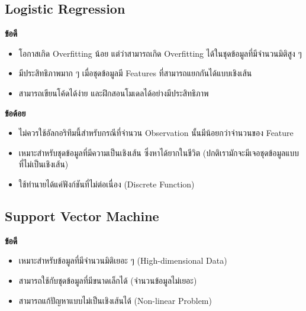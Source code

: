 \subsection{Logistic Regression}
\label{ssec:pros_cons_log_reg}

\noindent \textbf{ข้อดี}
\begin{itemize}[topsep=0pt]
    \item โอกาสเกิด Overfitting น้อย แต่ว่าสามารถเกิด Overfitting ได้ในชุดข้อมูลที่มีจำนวนมิติสูง ๆ
    
    \item มีประสิทธิภาพมาก ๆ เมื่อชุดข้อมูลมี Features ที่สามารถแยกกันได้แบบเชิงเส้น
    
    \item สามารถเขียนโค้ดได้ง่าย และฝึกสอนโมเดลได้อย่างมีประสิทธิภาพ
\end{itemize}

\noindent \textbf{ข้อด้อย}
\begin{itemize}[topsep=0pt]
    \item ไม่ควรใช้อัลกอริทึมนี้สำหรับกรณีที่จำนวน Observation นั้นมีน้อยกว่าจำนวนของ Feature

    \item เหมาะสำหรับชุดข้อมูลที่มีความเป็นเชิงเส้น ซึ่งหาได้ยากในชีวิต (ปกติเรามักจะมีเจอชุดข้อมูลแบบที่ไม่เป็นเชิงเส้น)
    
    \item ใช้ทำนายได้แค่ฟังก์ชันที่ไม่ต่อเนื่อง (Discrete Function)
\end{itemize}

\subsection{Support Vector Machine}
\label{ssec:pros_cons_svm}

\noindent \textbf{ข้อดี}
\begin{itemize}[topsep=0pt]
    \item เหมาะสำหรับข้อมูลที่มีจำนวนมิติเยอะ ๆ (High-dimensional Data)
    
    \item สามารถใช้กับชุดข้อมูลที่มีขนาดเล็กได้ (จำนวนข้อมูลไม่เยอะ)
    
    \item สามารถแก้ปัญหาแบบไม่เป็นเชิงเส้นได้ (Non-linear Problem)
\end{itemize}

